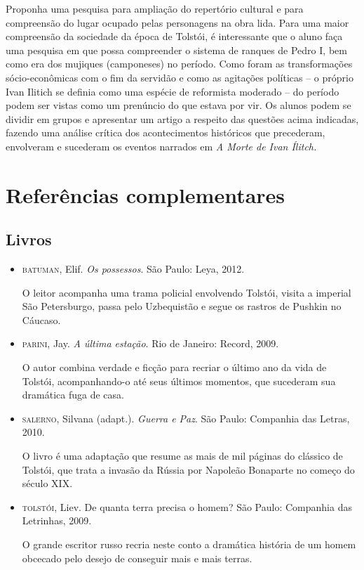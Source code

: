 \documentclass[12pt]{extarticle}
\begin{document}
Proponha uma pesquisa para ampliação do repertório cultural e para
compreensão do lugar ocupado pelas personagens na obra lida. Para uma
maior compreensão da sociedade da época de Tolstói, é interessante que
o aluno faça uma pesquisa em que possa compreender o sistema de
ranques de Pedro I, bem como era dos mujiques (camponeses) no período.
Como foram as transformações sócio-econômicas com o fim da servidão e
como as agitações políticas -- o próprio Ivan Ilitich se definia como
uma espécie de reformista moderado -- do período podem ser vistas como
um prenúncio do que estava por vir. Os alunos podem se dividir em
grupos e apresentar um artigo a respeito das questões acima indicadas,
fazendo uma análise crítica dos acontecimentos históricos que
precederam, envolveram e sucederam os eventos narrados em \emph{A
Morte de Ivan Ílitch.}






\section{Referências complementares}

\subsection{Livros}

\begin{itemize}
\item\textsc{batuman}, Elif. \textit{Os possessos}. São Paulo: Leya, 2012.

O leitor acompanha uma trama policial envolvendo Tolstói, visita a
imperial São Petersburgo, passa pelo Uzbequistão e segue os rastros de
Pushkin no Cáucaso.

\item\textsc{parini}, Jay. \textit{A última estação}. Rio de Janeiro: Record, 2009.

O autor combina verdade e ficção para recriar o último ano da vida de
Tolstói, acompanhando-o até seus últimos momentos, que sucederam sua
dramática fuga de casa.

\item\textsc{salerno}, Silvana (adapt.). \textit{Guerra e Paz}. São Paulo: Companhia
das Letras, 2010.

O livro é uma adaptação que resume as mais de mil páginas do clássico de
Tolstói, que trata a invasão da Rússia por Napoleão Bonaparte no começo
do século XIX.

\item\textsc{tolstói}, Liev. De quanta terra precisa o homem? São Paulo:
Companhia das Letrinhas, 2009.

O grande escritor russo recria neste conto a dramática história de um
homem obcecado pelo desejo de conseguir mais e mais terras.
\end{itemize}
\end{document}

